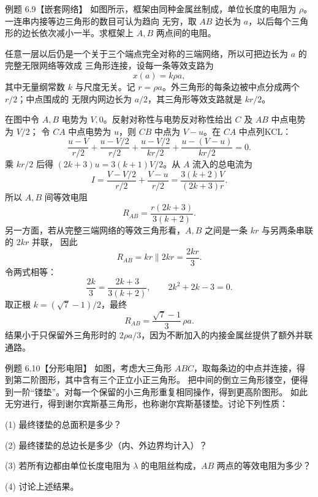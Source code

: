 \begin{origexamplebox}{例题 6.9【嵌套网络】}
如图所示，框架由同种金属丝制成，单位长度的电阻为 $\rho$。一连串内接等边三角形的数目可认为趋向
无穷，取 $AB$ 边长为 $a$，以后每个三角形的边长依次减小一半。求框架上 $A,B$ 两点间的电阻。
\nestedTriangleProblemFigure
{}
\end{origexamplebox}



\begin{xesolution}
任意一层以后仍是一个关于三个端点完全对称的三端网络，所以可把边长为 $a$ 的完整无限网络等效成
三角形连接，设每一条等效支路为
\[
  x(a)=k\rho a,
\]
其中无量纲常数 $k$ 与尺度无关。记 $r=\rho a$。外三角形的每条边被中点分成两个 $r/2$；中点围成的
无限内网边长为 $a/2$，其三角形等效支路就是 $kr/2$。

\nestedTriangleRecursionFigure
{}

在图中令 $A,B$ 电势为 $V,0$。反射对称性与电势反对称性给出 $C$ 及 $AB$ 中点电势为 $V/2$；
令 $CA$ 中点电势为 $u$，则 $CB$ 中点为 $V-u$。在 $CA$ 中点列KCL：
\[
 \frac{u-V}{r/2}+\frac{u-V/2}{r/2}
 +\frac{u-V/2}{kr/2}+\frac{u-(V-u)}{kr/2}=0.
\]
乘 $kr/2$ 后得 $(2k+3)u=3(k+1)V/2$。从 $A$ 流入的总电流为
\[
 I=\frac{V-V/2}{r/2}+\frac{V-u}{r/2}
 =\frac{3(k+2)V}{(2k+3)r}.
\]
所以 $A,B$ 间等效电阻
\[
  R_{AB}=\frac{r(2k+3)}{3(k+2)}.
\]
另一方面，若从完整三端网络的等效三角形看，$A,B$ 之间是一条 $kr$ 与另两条串联的 $2kr$ 并联，
因此
\[
  R_{AB}=kr\parallel 2kr=\frac{2kr}{3}.
\]
令两式相等：
\[
  \frac{2k}{3}=\frac{2k+3}{3(k+2)},
  \qquad 2k^2+2k-3=0.
\]
取正根 $k=(\sqrt7-1)/2$，最终
\[
  \boxed{R_{AB}=\frac{\sqrt7-1}{3}\,\rho a}.
\]
结果小于只保留外三角形时的 $2\rho a/3$，因为不断加入的内接金属丝提供了额外并联通路。
\end{xesolution}

\begin{origexamplebox}{例题 6.10【分形电阻】}
如图，考虑大三角形 $ABC$，取每条边的中点并连接，得到第二阶图形，其中含有三个正立小正三角形。
把中间的倒立三角形镂空，便得到一阶“镂垫”。对每一个保留的小三角形重复相同操作，得到更高阶图形。
如此无穷进行，得到谢尔宾斯基三角形，也称谢尔宾斯基镂垫。讨论下列性质：

(1) 最终镂垫的总面积是多少？

(2) 最终镂垫的总边长是多少（内、外边界均计入）？

(3) 若所有边都由单位长度电阻为 $\lambda$ 的电阻丝构成，$AB$ 两点的等效电阻为多少？

(4) 讨论上述结果。
\sierpinskiProblemFigure
{}
\end{origexamplebox}



